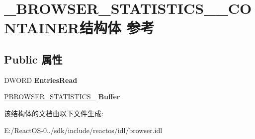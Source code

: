\hypertarget{struct___b_r_o_w_s_e_r___s_t_a_t_i_s_t_i_c_s__100___c_o_n_t_a_i_n_e_r}{}\section{\+\_\+\+B\+R\+O\+W\+S\+E\+R\+\_\+\+S\+T\+A\+T\+I\+S\+T\+I\+C\+S\+\_\+\_\+\+C\+O\+N\+T\+A\+I\+N\+E\+R结构体 参考}
\label{struct___b_r_o_w_s_e_r___s_t_a_t_i_s_t_i_c_s__100___c_o_n_t_a_i_n_e_r}
\subsection*{Public 属性}
\begin{DoxyCompactItemize}
\item 
\mbox{\label{struct___b_r_o_w_s_e_r___s_t_a_t_i_s_t_i_c_s__100___c_o_n_t_a_i_n_e_r_ae6d5412d3f7cbfe01691d71b39276751}} 
D\+W\+O\+RD {\bfseries Entries\+Read}
\item 
\mbox{\label{struct___b_r_o_w_s_e_r___s_t_a_t_i_s_t_i_c_s__100___c_o_n_t_a_i_n_e_r_ad7309b78eefcad6ff7d9d649a9005c53}} 
\hyperlink{struct___b_r_o_w_s_e_r___s_t_a_t_i_s_t_i_c_s__100}{P\+B\+R\+O\+W\+S\+E\+R\+\_\+\+S\+T\+A\+T\+I\+S\+T\+I\+C\+S\+\_} {\bfseries Buffer}
\end{DoxyCompactItemize}


该结构体的文档由以下文件生成\+:\begin{DoxyCompactItemize}
\item 
E\+:/\+React\+O\+S-\/0../sdk/include/reactos/idl/browser.\+idl\end{DoxyCompactItemize}
